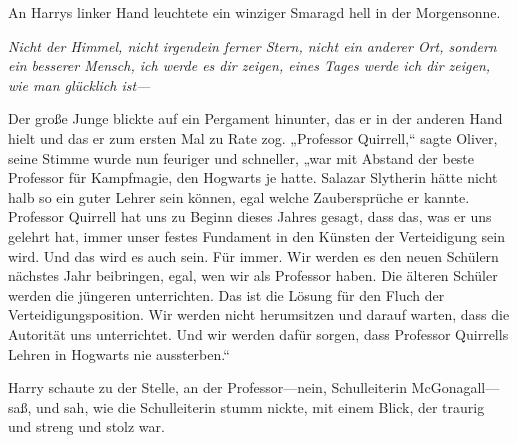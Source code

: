An Harrys linker Hand leuchtete ein winziger Smaragd hell in der Morgensonne.

\emph{Nicht der Himmel, nicht irgendein ferner Stern, nicht ein anderer Ort, sondern ein besserer Mensch, ich werde es dir zeigen, eines Tages werde ich dir zeigen, wie man glücklich ist—}

Der große Junge blickte auf ein Pergament hinunter, das er in der anderen Hand hielt und das er zum ersten Mal zu Rate zog.
„Professor Quirrell,“ sagte Oliver, seine Stimme wurde nun feuriger und schneller, „war mit Abstand der beste Professor für Kampfmagie, den Hogwarts je hatte. Salazar Slytherin hätte nicht halb so ein guter Lehrer sein können, egal welche Zaubersprüche er kannte. Professor Quirrell hat uns zu Beginn dieses Jahres gesagt, dass das, was er uns gelehrt hat, immer unser festes Fundament in den Künsten der Verteidigung sein wird. Und das wird es auch sein. Für immer. Wir werden es den neuen Schülern nächstes Jahr beibringen, egal, wen wir als Professor haben. Die älteren Schüler werden die jüngeren unterrichten. Das ist die Lösung für den Fluch der Verteidigungsposition. Wir werden nicht herumsitzen und darauf warten, dass die Autorität uns unterrichtet. Und wir werden dafür sorgen, dass Professor Quirrells Lehren in Hogwarts nie aussterben.“

Harry schaute zu der Stelle, an der Professor—nein, Schulleiterin McGonagall—saß, und sah, wie die Schulleiterin stumm nickte, mit einem Blick, der traurig und streng und stolz war.

